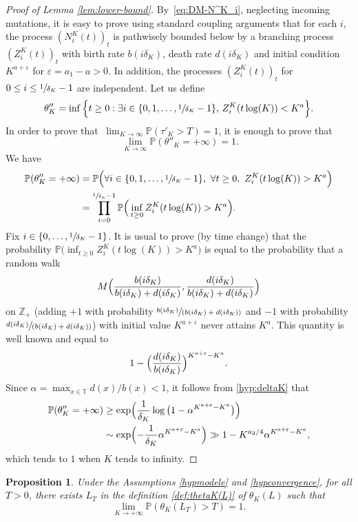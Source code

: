 \documentclass[JEP,XML,SOM,Unicode,published]{cedram}
\let\sep:
\newcommand{\spfrac}[2]{\sfrac{#1}{(#2)}}
\theoremstyle{plain}
\newtheorem{prop}[theorem]{Proposition}
\theoremstyle{remark}
\newcommand\T{\mathbb{T}}
\newcommand\Z{\mathbb{Z}}
\begin{document}
\begin{proof}[Proof of Lemma \ref{lem:lower-bound}]
By~\eqref{eq:DM-N^K_i}, neglecting incoming mutations, it is easy to prove using standard coupling arguments that for each $i$, the process $(N_i^K(t))_{t}$ is pathwisely bounded below by a branching process $(Z_i^K(t))_{t}$ with birth rate $b(i\delta_K)$, death rate $d(i\delta_K)$ and initial condition $K^{a+\varepsilon}$ for $\varepsilon=a_1-a>0$.
In addition, the processes $(Z_i^K(t))_{t}$ for $0\leq i\leq \sfrac{1}{\delta_K}-1$ are independent. Let us define
\[
\theta''_{K} = \inf\Big\{t\ge 0\sep \exists i \in \{0, 1,\dots, \sfrac{1}{\delta_K}-1\},\, Z^K_i(t\log(K)) < K^a\Big\} .
\]
In order to prove that $\ \lim_{K\to \infty} \mathbb{P}(\tau'_{K}>T) =1$, it is enough to prove that
\[\ \lim_{K\to \infty} \mathbb{P}(\theta''_{K}=+\infty) =1.\]
We have
\begin{align*}
\mathbb{P}(\theta''_{K}=+\infty) &= \mathbb{P}\Big(\forall i\in \{0,1,\dots, \sfrac{1}{\delta_K}-1\} ,\ \forall t\geq 0,\ Z^K_i(t \log(K)) >K^a\Big)\\
&= \prod_{i=0}^{\sfrac{1}{\delta_K}-1}\mathbb{P}\Big(\inf_{t\ge 0} Z^K_i(t\log(K)) >K^a\Big).
\end{align*}
Fix $i\in\{0,\ldots,\sfrac{1}{\delta_K}-1\}$. It is usual to prove (by time change) that the probability $\mathbb{P}\big(\inf_{t\ge 0} Z^K_i(t\log(K)) >K^a\big)$ is equal to the probability that a random walk
\[
M\Bigl({b(i\delta_K)\over b(i\delta_K)+d(i\delta_K)}, {d(i\delta_K)\over b(i\delta_K)+d(i\delta_K)}\Bigl)
\]
on $\Z_{+}$ (adding $+1$ with probability $\spfrac{b(i\delta_K)}{b(i\delta_K)+d(i\delta_K)}$ and $-1$ with probability $\spfrac{d(i\delta_K)}{b(i\delta_K)+d(i\delta_K)}$) with initial value $K^{a+\varepsilon}$ never attains $K^a$.
This quantity is well known and equal to
\[1 -\Big({d(i\delta_K)\over b(i\delta_K)}\Big)^{K^{a+\varepsilon}-K^a}.\]
Since $\alpha=\max_{x\in\T}d(x)/b(x)<1$, it follows from \eqref{hyp:deltaK} that
\begin{align*}
\mathbb{P}(\theta''_{K}=+\infty) &\geq \exp\Bigl({1\over \delta_K} \log\big(1 -\alpha^{K^{a+\varepsilon}-K^a}\big)\Bigr)\\
&\sim \exp\Bigl(- {1\over \delta_K}\alpha^{K^{a+\varepsilon}-K^a}\Bigr)\gg 1-K^{{a_2}/4} \alpha^{K^{a+\varepsilon}-K^a},
\end{align*}
which tends to $1$ when $K$ tends to infinity.
\end{proof}

\begin{prop}
\label{prop:Lipschitz-estimate}
Under the Assumptions \ref{hypmodele} and \ref{hypconvergence}, for all $T>0$, there exists $L_T$ in the definition \eqref{def:thetaK(L)} of $\theta_K(L)$ such that
\[
\lim_{K\to+\infty}\mathbb{P}(\theta_K(L_T)>T)=1.
\]
\end{prop}
\end{document}

